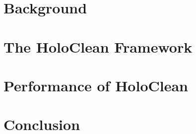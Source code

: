 \section{Background}\label{sec:background}

\section{The HoloClean Framework}\label{sec:framework}

\section{Performance of HoloClean}\label{sec:performance}

\section{Conclusion}\label{sec:conclusion}
